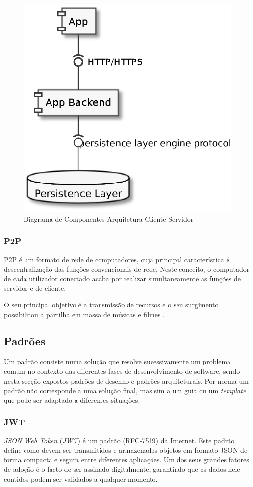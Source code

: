 \begin{figure}[H]
    \begin{center}
    \includegraphics[width=0.5 \textwidth]{figures/actual_web.eps}
    \caption{Diagrama de Componentes Arquitetura Cliente Servidor}
    \end{center}
\end{figure}

\subsubsection{P2P \label{subsection:p2p}}
P2P é um formato de rede de computadores, cuja principal característica é descentralização das funções convencionais de rede. Neste conceito, o computador de cada utilizador conectado acaba por realizar simultaneamente as funções de servidor e de cliente\cite{what_are_P2P_networks}.

O seu principal objetivo é a transmissão de recursos e o seu surgimento possibilitou a partilha em massa de músicas e filmes \cite{what_are_P2P_networks}.

\subsection{Padrões}
Um padrão consiste numa solução que resolve sucessivamente um problema comum no contexto das diferentes fases de desenvolvimento de software, sendo nesta secção expostos padrões de desenho e padrões arquiteturais. Por norma um padrão não corresponde a uma solução final, mas sim a um guia ou um \emph{template} que pode ser adaptado a diferentes situações\cite{clean_architecture}.

\subsubsection{JWT \label{subsection:jwt}}
\emph{JSON Web Token} (\emph{JWT\label{sym:jwt}}) é um padrão (RFC-7519) da Internet. Este padrão define como devem ser transmitidos e armazenados objetos em formato JSON de forma compacta e segura entre diferentes aplicações. Um dos seus grandes fatores de adoção é o facto de ser assinado digitalmente, garantindo que os dados nele contidos podem ser validados a qualquer momento\cite{jwt_medium}.


